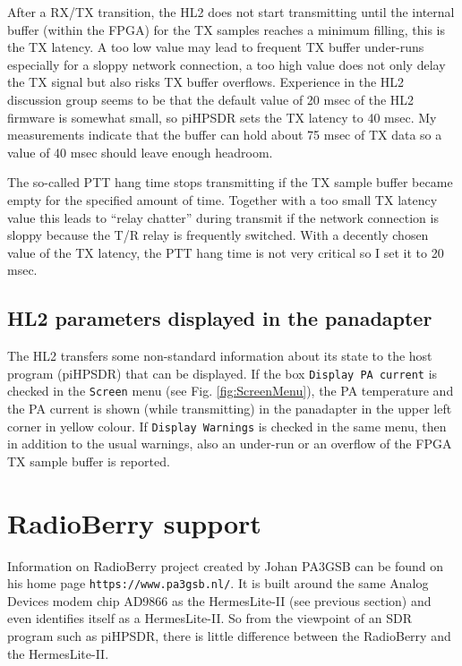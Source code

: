 \documentclass[12pt]{book}
\def\rett#1{\texttt{\color{red}#1}}
\def\bltt#1{\texttt{\color{blue}#1}}
\def\pH{pi\-HPSDR\xspace}
\begin{document}
After a RX/TX transition, the HL2 does not start transmitting until the internal buffer (within the FPGA)
for the TX samples reaches a  minimum filling, this is the TX latency. A too low value may lead to
frequent TX buffer under-runs especially for a  sloppy network connection, a too high value does not
only delay the TX signal but also risks TX buffer overflows. Experience in the HL2  discussion group
seems to be that the default value of 20 msec of the HL2 firmware
is somewhat small, so \pH sets the TX latency to 40 msec. My measurements
indicate that the buffer can hold about 75 msec of TX data so a value of 40 msec should leave enough headroom.

The so-called PTT hang time stops transmitting if the TX sample buffer became empty for the specified
amount of time. Together with a too small TX latency value this leads to ``relay chatter'' during transmit
if the network connection is sloppy because the T/R relay is frequently switched. With a decently chosen
value of the TX latency, the PTT hang time is not very critical so I set it to 20 msec.

\subsection{HL2 parameters displayed in the panadapter}

The HL2 transfers some non-standard information about its state to the host program (\pH) that can be displayed.
If the box \rett{Display PA current} is checked in the \bltt{Screen} menu (see Fig. \ref{fig:ScreenMenu}),
the PA temperature and the PA current is shown (while transmitting) in the panadapter in the upper
left corner in yellow colour. If \rett{Display Warnings} is checked in the same menu, then in addition to
the usual warnings, also an under-run or an overflow of the FPGA TX sample buffer is reported.

\section{RadioBerry support}
\label{sec:radioberry}

Information on RadioBerry project created by Johan PA3GSB can be found on his home page
\texttt{https://www.pa3gsb.nl/}. It is built around the same Analog Devices modem chip AD9866
as the HermesLite-II (see previous section) and even identifies itself as a HermesLite-II. So from
the viewpoint of an SDR program such as \pH, there is little difference between the RadioBerry and
the HermesLite-II.
\end{document}
